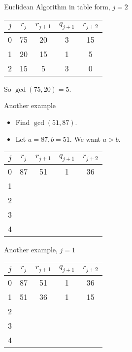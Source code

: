 \documentclass{beamer}
\begin{document}
\begin{frame}{Euclidean Algorithm in table form, $j=2$}

\begin{tabular}{|c|c|c|c|c|}\hline
$j$   &  $r_{j}$    & $r_{j+1}$ & $q_{j+1}$ & $r_{j+2}$ \\ \hline\hline
0     &  75         &  20       &    3      &   15      \\ \hline
1     &  20         &  15       &    1      &   5       \\ \hline
2     &  15         &  5        &    3      &   0       \\ \hline
\end{tabular}

\vspace{0.5in}

So $\gcd(75, 20) = 5$.

\end{frame}

\begin{frame}{Another example}

\begin{itemize}
\item Find $\gcd(51, 87)$.
\item Let $a=87, b=51$. We want $a>b$.
\end{itemize}

\pause

\begin{tabular}{|c|c|c|c|c|}\hline
$j$   &  $r_{j}$    & $r_{j+1}$ & $q_{j+1}$ & $r_{j+2}$ \\ \hline\hline
0     &  87         &  51       &    1      &   36      \\ \hline
1     &             &           &           &           \\ \hline
2     &             &           &           &           \\ \hline
3     &             &           &           &           \\ \hline
4     &             &           &           &           \\ \hline
\end{tabular}

\end{frame}

\begin{frame}{Another example, $j=1$}

\begin{tabular}{|c|c|c|c|c|}\hline
$j$   &  $r_{j}$    & $r_{j+1}$ & $q_{j+1}$ & $r_{j+2}$ \\ \hline\hline
0     &  87         &  51       &    1      &   36      \\ \hline
1     &  51         &  36       &    1      &   15      \\ \hline
2     &             &           &           &           \\ \hline
3     &             &           &           &           \\ \hline
4     &             &           &           &           \\ \hline
\end{tabular}

\end{frame}
\end{document}
